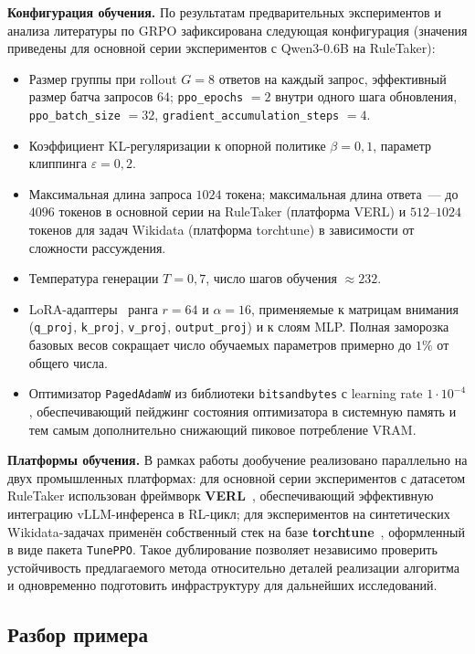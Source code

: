\textbf{Конфигурация обучения.} По результатам предварительных экспериментов и анализа литературы по GRPO зафиксирована следующая конфигурация (значения приведены для основной серии экспериментов с Qwen3-0.6B на RuleTaker):
\begin{itemize}
    \setlength{\itemsep}{\smallskipamount}
    \item Размер группы при rollout $G = 8$ ответов на каждый запрос, эффективный размер батча запросов $64$; \texttt{ppo\_epochs} $= 2$ внутри одного шага обновления, \texttt{ppo\_batch\_size} $= 32$, \texttt{gradient\_accumulation\_steps} $= 4$.
    \item Коэффициент KL-регуляризации к опорной политике $\beta = 0{,}1$, параметр клиппинга $\varepsilon = 0{,}2$.
    \item Максимальная длина запроса $1024$ токена; максимальная длина ответа~--- до $4096$ токенов в основной серии на RuleTaker (платформа VERL) и $512$--$1024$ токенов для задач Wikidata (платформа torchtune) в зависимости от сложности рассуждения.
    \item Температура генерации $T = 0{,}7$, число шагов обучения $\approx 232$.
    \item LoRA-адаптеры~\cite{hu2022lora} ранга $r = 64$ и $\alpha = 16$, применяемые к матрицам внимания (\texttt{q\_proj}, \texttt{k\_proj}, \texttt{v\_proj}, \texttt{output\_proj}) и к слоям MLP. Полная заморозка базовых весов сокращает число обучаемых параметров примерно до $1\%$ от общего числа.
    \item Оптимизатор \texttt{PagedAdamW} из библиотеки \texttt{bitsandbytes} с learning rate $1 \cdot 10^{-4}$, обеспечивающий пейджинг состояния оптимизатора в системную память и тем самым дополнительно снижающий пиковое потребление VRAM.
\end{itemize}

\textbf{Платформы обучения.} В рамках работы дообучение реализовано параллельно на двух промышленных платформах: для основной серии экспериментов с датасетом RuleTaker использован фреймворк \textbf{VERL}~\cite{sheng2024verl}, обеспечивающий эффективную интеграцию vLLM-инференса в RL-цикл; для экспериментов на синтетических Wikidata-задачах применён собственный стек на базе \textbf{torchtune}~\cite{torchtune2024}, оформленный в виде пакета \texttt{TunePPO}. Такое дублирование позволяет независимо проверить устойчивость предлагаемого метода относительно деталей реализации алгоритма и одновременно подготовить инфраструктуру для дальнейших исследований.

\subsection{Разбор примера}
\label{subsec:worked-example}

